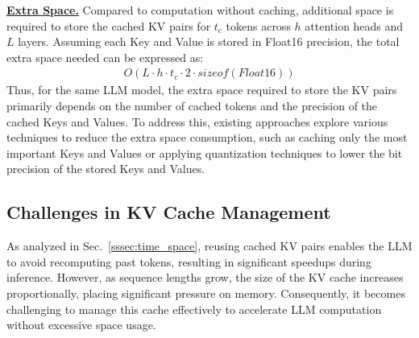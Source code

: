 \noindent \underline{\textbf{Extra Space.}}
Compared to computation without caching, additional space is required to store the cached KV pairs for $t_c$ tokens across $h$ attention heads and $L$ layers. Assuming each Key and Value is stored in Float16 precision, the total extra space needed can be expressed as:
\begin{align}
    O(L\cdot h \cdot t_c \cdot 2 \cdot sizeof(Float16))    
\end{align}
\noindent 
Thus, for the same LLM model, the extra space required to store the KV pairs primarily depends on the number of cached tokens and the precision of the cached Keys and Values. 
To address this, existing approaches explore various techniques to reduce the extra space consumption, such as caching only the most important Keys and Values or applying quantization techniques to lower the bit precision of the stored Keys and Values.






 


\subsection{Challenges in KV Cache Management}\label{ssec:kv_cache_challenge}
As analyzed in Sec.~\ref{sssec:time_space}, 
reusing cached KV pairs enables the LLM to avoid recomputing past tokens, resulting in significant speedups during inference. However, as sequence lengths grow, the size of the KV cache increases proportionally, placing significant pressure on memory. Consequently, it becomes challenging to manage this cache effectively to accelerate LLM computation without excessive space usage.

